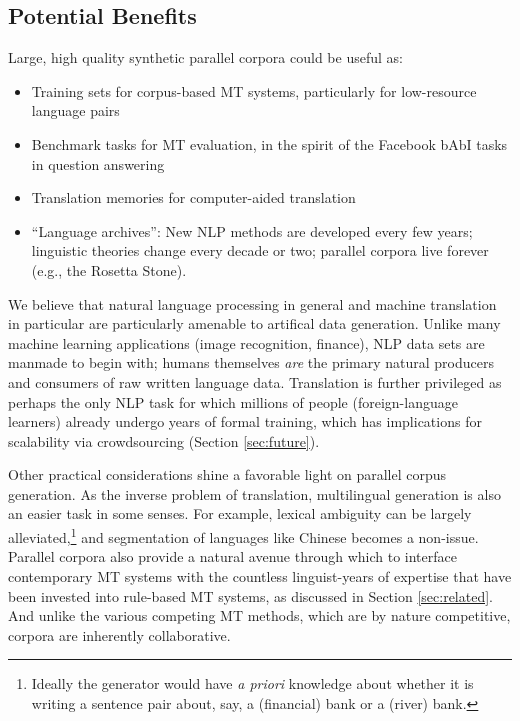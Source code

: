 \subsection{Potential Benefits}
\label{subsec:benefits}

Large, high quality synthetic parallel corpora could be useful as:

\begin{itemize}
\item Training sets for corpus-based MT systems, particularly for low-resource language pairs
\item Benchmark tasks for MT evaluation, in the spirit of the Facebook bAbI tasks in question answering 
\item Translation memories for computer-aided translation
\item ``Language archives'': New NLP methods are developed every few years; linguistic theories change every decade or two; parallel corpora live forever (e.g., the Rosetta Stone).
\end{itemize}

We believe that natural language processing in general and machine translation in particular are particularly amenable to artifical data generation. 
Unlike many machine learning applications (image recognition, finance), NLP data sets are manmade to begin with; humans themselves {\em are} the primary natural producers and consumers of raw written language data.
Translation is further privileged as perhaps the only NLP task for which millions of people (foreign-language learners) already undergo years of formal training, which has implications for scalability via crowdsourcing (Section \ref{sec:future}).

Other practical considerations shine a favorable light on parallel corpus generation.
As the inverse problem of translation, multilingual generation is also an easier task in some senses. 
For example, lexical ambiguity can be largely alleviated,\footnote{
    Ideally the generator would have {\em a priori} knowledge about whether it is writing a sentence pair about, say,  a (financial) bank or a (river) bank.
} and segmentation of languages like Chinese  becomes a non-issue.
Parallel corpora also provide a natural avenue through which to interface contemporary MT systems with the countless linguist-years of expertise that have been invested into rule-based MT systems, as discussed in Section \ref{sec:related}.
And unlike the various competing MT methods, which are by nature competitive, corpora are inherently collaborative.

